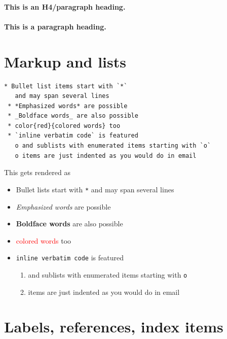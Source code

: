 \documentclass[%
twoside,                 %
final,                   %
chapterprefix=true,      %
open=right               %
10pt]{book}
\begin{document}
\paragraph{This is an H4/paragraph heading.}
\paragraph{This is a paragraph heading.}
\section*{Markup and lists}

\begin{Verbatim}[numbers=none,fontsize=\fontsize{9pt}{9pt},baselinestretch=0.95]
 * Bullet list items start with `*`
   and may span several lines
 * *Emphasized words* are possible
 * _Boldface words_ are also possible
 * color{red}{colored words} too
 * `inline verbatim code` is featured
   o and sublists with enumerated items starting with `o`
   o items are just indented as you would do in email
\end{Verbatim}

This gets rendered as

\begin{itemize}
 \item Bullet lists start with \Verb!*!
   and may span several lines

 \item \emph{Emphasized words} are possible

 \item \textbf{Boldface words} are also possible

 \item \textcolor{red}{colored words} too

 \item \Verb!inline verbatim code! is featured
\begin{enumerate}

  \item and sublists with enumerated items starting with \Verb!o!

  \item items are just indented as you would do in email
\end{enumerate}

\noindent
\end{itemize}

\noindent
\section*{Labels, references, index items}
\end{document}
